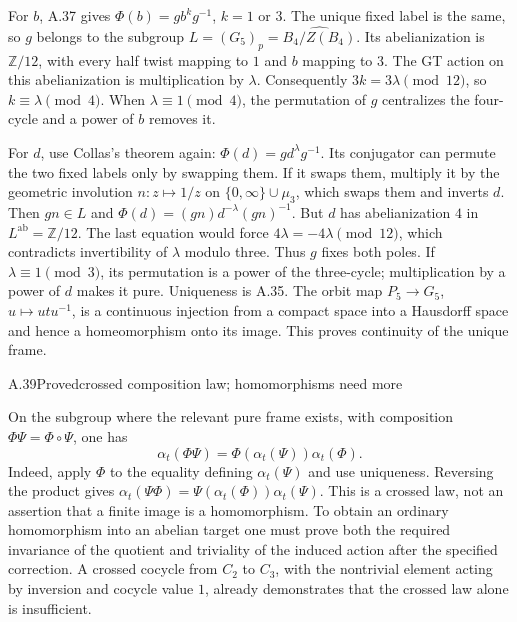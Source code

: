 For $b$, A.37 gives $\Phi(b)=g b^k g^{-1}$, $k=1$ or $3$.
The unique fixed label is the same, so $g$ belongs to the subgroup
$L=(G_5)_p=\widehat{B_4/Z(B_4)}$. Its abelianization is
$\mathbb Z/12$, with every half twist mapping to $1$ and $b$ mapping to $3$.
The GT action on this abelianization is multiplication by $\lambda$.
Consequently $3k=3\lambda\pmod{12}$, so $k\equiv\lambda\pmod4$.
When $\lambda\equiv1\pmod4$, the permutation of $g$ centralizes the
four-cycle and a power of $b$ removes it.

For $d$, use Collas's theorem again:
$\Phi(d)=g d^\lambda g^{-1}$. Its conjugator can permute the two fixed
labels only by swapping them. If it swaps them, multiply it by the
geometric involution $n:z\mapsto1/z$ on
$\{0,\infty\}\cup\mu_3$, which swaps them and inverts $d$.
Then $gn\in L$ and $\Phi(d)=(gn)d^{-\lambda}(gn)^{-1}$.
But $d$ has abelianization $4$ in $L^{\mathrm{ab}}=\mathbb Z/12$.
The last equation would force $4\lambda=-4\lambda\pmod{12}$, which
contradicts invertibility of $\lambda$ modulo three. Thus $g$ fixes both
poles. If $\lambda\equiv1\pmod3$, its permutation is a power of the
three-cycle; multiplication by a power of $d$ makes it pure.
Uniqueness is A.35. The orbit map $P_5\to G_5$,
$u\mapsto utu^{-1}$, is a continuous injection from a compact space into a
Hausdorff space and hence a homeomorphism onto its image. This proves
continuity of the unique frame.

\begin{statement}{A.39}{Proved}{crossed composition law; homomorphisms need more}
\end{statement}
On the subgroup where the relevant pure frame exists, with composition
$\Phi\Psi=\Phi\circ\Psi$, one has
\[
 \alpha_t(\Phi\Psi)=\Phi(\alpha_t(\Psi))\alpha_t(\Phi).
\]
Indeed, apply $\Phi$ to the equality defining $\alpha_t(\Psi)$ and use
uniqueness. Reversing the product gives
$\alpha_t(\Psi\Phi)=\Psi(\alpha_t(\Phi))\alpha_t(\Psi)$.
This is a crossed law, not an assertion that a finite image is a
homomorphism. To obtain an ordinary homomorphism into an abelian target one
must prove both the required invariance of the quotient and triviality of
the induced action after the specified correction. A crossed cocycle from
$C_2$ to $C_3$, with the nontrivial element acting by inversion and cocycle
value $1$, already demonstrates that the crossed law alone is insufficient.

